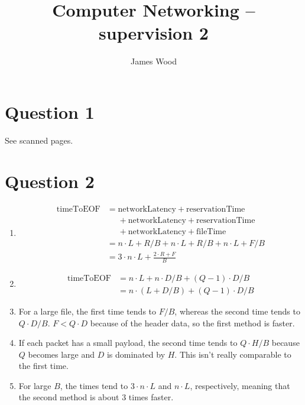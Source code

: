 \documentclass{article}
\begin{document}
\title{Computer Networking -- supervision 2}
\author{James Wood}
\maketitle


\section*{Question 1}
See scanned pages.

\section*{Question 2}
\begin{enumerate}
  \item
    \begin{align*}
      \textrm{timeToEOF} & = \textrm{networkLatency} + \textrm{reservationTime} \\
                         & \phantom{=} {} + \textrm{networkLatency} + \textrm{reservationTime} \\
                         & \phantom{=} {} + \textrm{networkLatency} + \textrm{fileTime} \\
                         & = n \cdot L + R / B + n \cdot L + R / B + n \cdot L + F / B \\
                         & = 3 \cdot n \cdot L + \frac{2 \cdot R + F}{B}
    \end{align*}
  \item
    \begin{align*}
      \textrm{timeToEOF} & = n \cdot L + n \cdot D / B + (Q - 1) \cdot D / B \\
                         & = n \cdot (L + D / B) + (Q - 1) \cdot D / B
    \end{align*}
  \item For a large file, the first time tends to $F / B$, whereas the second time tends to $Q \cdot D / B$. $F < Q \cdot D$ because of the header data, so the first method is faster.
  \item If each packet has a small payload, the second time tends to $Q \cdot H / B$ because $Q$ becomes large and $D$ is dominated by $H$. This isn't really comparable to the first time.
  \item For large $B$, the times tend to $3 \cdot n \cdot L$ and $n \cdot L$, respectively, meaning that the second method is about 3 times faster.
\end{enumerate}
\end{document}
